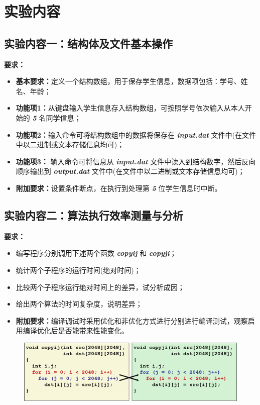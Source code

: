 \section{实验内容}
    \subsection{实验内容一：结构体及文件基本操作}
        \textbf{要求：}
        \begin{itemize}
            \item \textbf{基本要求：}定义一个结构数组，用于保存学生信息，数据项包括：学号、姓名、年龄；
            \item \textbf{功能项1：}从键盘输入学生信息存入结构数组，可按照学号依次输入从本人开始的 \textbf{\textit{5}} 名同学信息；
            \item \textbf{功能项2：}输入命令可将结构数组中的数据将保存在 \textbf{\textit{input.dat}} 文件中(在文件中以二进制或文本存储信息均可)；
            \item \textbf{功能项3：} 输入命令可将信息从 \textbf{\textit{input.dat}} 文件中读入到结构数字，然后反向顺序输出到 \textbf{\textit{output.dat}} 文件中(在文件中以二进制或文本存储信息均可)；
            \item \textbf{附加要求：}设置条件断点，在执行到处理第 \textbf{\textit{5}} 位学生信息时中断。
        \end{itemize}
    \subsection{实验内容二：算法执行效率测量与分析}
        \textbf{要求：}
        \begin{itemize}
            \item 编写程序分别调用下述两个函数 \textbf{\textit{copyij}} 和 \textbf{\textit{copyji}}；
            \item 统计两个子程序的运行时间(绝对时间)；
            \item 比较两个子程序运行绝对时间上的差异，试分析成因；
            \item 给出两个算法的时间复杂度，说明差异；
            \item \textbf{附加要求：}编译调试时采用优化和非优化方式进行分别进行编译测试，观察启用编译优化后是否能带来性能变化。
        \end{itemize}
        \begin{figure}[htbp]
            \centering
            \includegraphics*[width = 14cm]{program1.jpg}
        \end{figure}